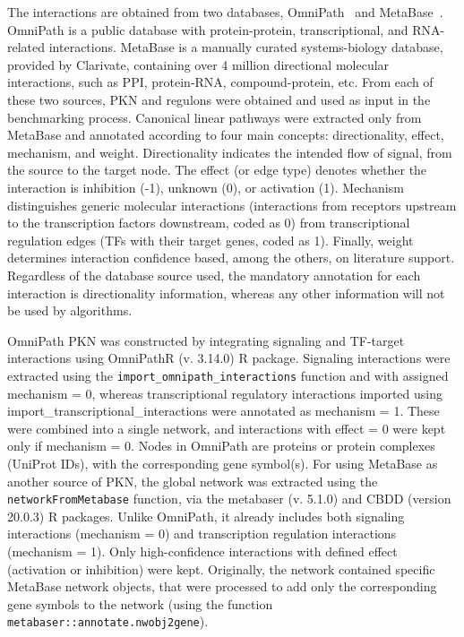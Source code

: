 The interactions are obtained from two databases, OmniPath~\cite{RN91} and MetaBase~\cite{RN33}. 
OmniPath is a public database with protein-protein, transcriptional, and \gls{RNA}-related interactions. MetaBase is a manually curated systems-biology database, provided by Clarivate, containing over 4 million directional molecular interactions, such as \gls{PPI}, protein-\gls{RNA}, compound-protein, etc. 
From each of these two sources, \gls{PKN} and regulons were obtained and used as input in the benchmarking process. Canonical linear pathways were extracted only from MetaBase and annotated according to four main concepts: directionality, effect, mechanism, and weight. 
Directionality indicates the intended flow of signal, from the source to the target node. 
The effect (or edge type) denotes whether the interaction is inhibition (-1), unknown (0), or activation (1). 
Mechanism distinguishes generic molecular interactions (interactions from receptors upstream to the transcription factors downstream, coded as 0) from transcriptional regulation edges (\gls{TF}s with their target genes, coded as 1). 
Finally, weight determines interaction confidence based, among the others, on literature support. Regardless of the database source used, the mandatory annotation for each interaction is directionality information, whereas any other information will not be used by algorithms. 

OmniPath \gls{PKN} was constructed by integrating signaling and \gls{TF}-target interactions using OmniPathR (v. 3.14.0) \gls{R} package. 
Signaling interactions were extracted using the \texttt{import\_omnipath\_interactions} function and with assigned mechanism = 0, whereas transcriptional regulatory interactions imported using import\_transcriptional\_interactions were annotated as mechanism = 1. 
These were combined into a single network, and interactions with effect = 0 were kept only if mechanism = 0. Nodes in OmniPath are proteins or protein complexes (UniProt IDs), with the corresponding gene symbol(s). 
For using MetaBase as another source of \gls{PKN}, the global network was extracted using the \texttt{networkFromMetabase} function, via the metabaser (v. 5.1.0) and \gls{CBDD} (version 20.0.3) \gls{R} packages. 
Unlike OmniPath, it already includes both signaling interactions (mechanism = 0) and transcription regulation interactions (mechanism = 1). 
Only high-confidence interactions with defined effect (activation or inhibition) were kept. 
Originally, the network contained specific MetaBase network objects, that were processed to add only the corresponding gene symbols to the network (using the function \texttt{metabaser::annotate.nwobj2gene}).

